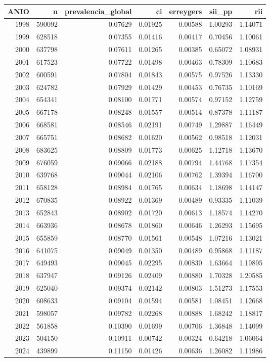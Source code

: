 \begin{tabular}{rrrrrrr}
\toprule
ANIO & n & prevalencia\_global & ci & erreygers & sii\_pp & rii \\
\midrule
1998 & 590092 & 0.07629 & 0.01925 & 0.00588 & 1.00293 & 1.14071 \\
1999 & 628518 & 0.07355 & 0.01416 & 0.00417 & 0.70456 & 1.10061 \\
2000 & 637798 & 0.07611 & 0.01265 & 0.00385 & 0.65072 & 1.08931 \\
2001 & 617523 & 0.07722 & 0.01498 & 0.00463 & 0.78309 & 1.10683 \\
2002 & 600591 & 0.07804 & 0.01843 & 0.00575 & 0.97526 & 1.13330 \\
2003 & 624782 & 0.07929 & 0.01429 & 0.00453 & 0.76735 & 1.10169 \\
2004 & 654341 & 0.08100 & 0.01771 & 0.00574 & 0.97152 & 1.12759 \\
2005 & 667178 & 0.08248 & 0.01557 & 0.00514 & 0.87378 & 1.11187 \\
2006 & 668581 & 0.08546 & 0.02191 & 0.00749 & 1.29887 & 1.16449 \\
2007 & 665751 & 0.08682 & 0.01620 & 0.00562 & 0.98518 & 1.12031 \\
2008 & 683625 & 0.08809 & 0.01773 & 0.00625 & 1.12718 & 1.13670 \\
2009 & 676059 & 0.09066 & 0.02188 & 0.00794 & 1.44768 & 1.17354 \\
2010 & 639768 & 0.09044 & 0.02106 & 0.00762 & 1.39394 & 1.16700 \\
2011 & 658128 & 0.08984 & 0.01765 & 0.00634 & 1.18698 & 1.14147 \\
2012 & 670835 & 0.08922 & 0.01369 & 0.00489 & 0.93335 & 1.11039 \\
2013 & 652843 & 0.08902 & 0.01720 & 0.00613 & 1.18574 & 1.14270 \\
2014 & 663936 & 0.08678 & 0.01860 & 0.00646 & 1.26293 & 1.15695 \\
2015 & 655859 & 0.08770 & 0.01561 & 0.00548 & 1.07216 & 1.13021 \\
2016 & 641075 & 0.09049 & 0.01350 & 0.00489 & 0.95868 & 1.11187 \\
2017 & 649493 & 0.09045 & 0.02295 & 0.00830 & 1.63664 & 1.19895 \\
2018 & 637947 & 0.09126 & 0.02409 & 0.00880 & 1.70328 & 1.20585 \\
2019 & 625040 & 0.09374 & 0.02142 & 0.00803 & 1.51273 & 1.17553 \\
2020 & 608633 & 0.09104 & 0.01594 & 0.00581 & 1.08451 & 1.12668 \\
2021 & 598057 & 0.09782 & 0.02268 & 0.00888 & 1.68242 & 1.18817 \\
2022 & 561858 & 0.10390 & 0.01699 & 0.00706 & 1.36848 & 1.14099 \\
2023 & 504150 & 0.10911 & 0.00742 & 0.00324 & 0.64218 & 1.06064 \\
2024 & 439899 & 0.11150 & 0.01426 & 0.00636 & 1.26082 & 1.11986 \\
\bottomrule
\end{tabular}
